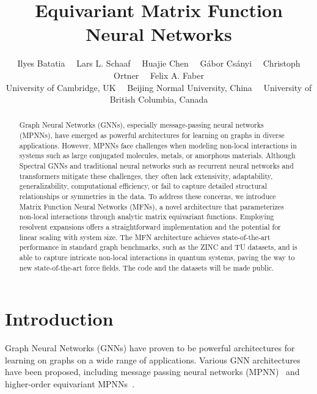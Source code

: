 \documentclass{article} \usepackage{iclr2024_conference,times}
\title{\Large Equivariant Matrix Function Neural Networks}
\author{Ilyes Batatia \ \
Lars L. Schaaf \ \
Huajie Chen \ \
Gábor Csányi \ \
Christoph Ortner \ \
Felix A. Faber  \\
\small{ University of Cambridge, UK \ \ 
 Beijing Normal University, China  \ \
 University of British Columbia, Canada }
}
\begin{document}
\maketitle

\begin{abstract}

Graph Neural Networks (GNNs), especially message-passing neural networks (MPNNs), have emerged as powerful architectures for learning on graphs in diverse applications. However, MPNNs face challenges when modeling non-local interactions in systems such as large conjugated molecules, metals, or amorphous materials. 
Although Spectral GNNs and traditional neural networks such as recurrent neural networks and transformers mitigate these challenges, they often lack extensivity, adaptability, generalizability, computational efficiency, or fail to capture detailed structural relationships or symmetries in the data. To address these concerns, we introduce Matrix Function Neural Networks (MFNs), a novel architecture that parameterizes non-local interactions through analytic matrix equivariant functions. Employing resolvent expansions offers a straightforward implementation and the potential for linear scaling with system size.
The MFN architecture achieves state-of-the-art performance in standard graph benchmarks, such as the ZINC and TU datasets, and is able to capture intricate non-local interactions in quantum systems, paving the way to new state-of-the-art force fields. The code and the datasets will be made public.

\end{abstract}

\section{Introduction}

Graph Neural Networks (GNNs) have proven to be powerful architectures for learning on graphs on a wide range of applications. Various GNN architectures have been proposed, including message passing neural networks (MPNN)~\citep{gilmer2017neural, battaglia2018relational, kipf2016semi, velivckovic2017graph, wu2020comprehensive, deepmind2018protein, hu2019deep, nequip} and higher-order equivariant MPNNs~\citep{Batatia2022mace}. 
\end{document}
